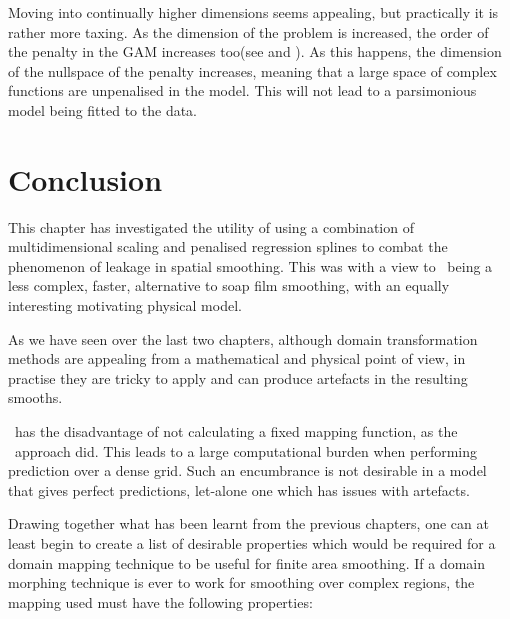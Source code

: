 {Moving into continually higher dimensions seems appealing, but practically it is rather more taxing. As the dimension of the problem is increased, the order of the penalty in the GAM increases too(see  and ). As this happens, the dimension of the nullspace of the penalty increases, meaning that a large space of complex functions are unpenalised in the model. This will not lead to a parsimonious model being fitted to the data.


\section{Conclusion}
\label{mds-conc}

This chapter has investigated the utility of using a combination of multidimensional scaling and penalised regression splines to combat the phenomenon of leakage in spatial smoothing. This was with a view to \mdsap\ being a less complex, faster, alternative to soap film smoothing, with an equally interesting motivating physical model.

As we have seen over the last two chapters, although domain transformation methods are appealing from a mathematical and physical point of view, in practise they are tricky to apply and can produce artefacts in the resulting smooths.

\mdsap\ has the disadvantage of not calculating a fixed mapping function, as the \sch\ approach did. This leads to a large computational burden when performing prediction over a dense grid. Such an encumbrance is not desirable in a model that gives perfect predictions, let-alone one which has issues with artefacts.

Drawing together what has been learnt from the previous chapters, one can at least begin to create a list of desirable properties which would be required for a domain mapping technique to be useful for finite area smoothing. If a domain morphing technique is ever to work for smoothing over complex regions, the mapping used must have the following properties:

}
